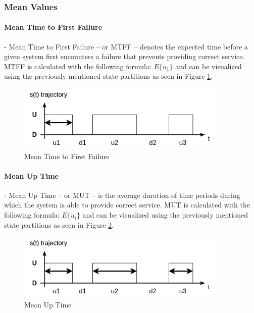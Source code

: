 \subsubsection{Mean Values} \label{background-dep-metrics-mean-values}

\paragraph{Mean Time to First Failure} - Mean Time to First Failure -- or MTFF -- denotes the expected time before a given system first encounters a failure that prevents providing correct service. MTFF is calculated with the following formula: \(E\{u_1\}\) and can be visualized using the previously mentioned state partitions as seen in Figure \ref{fig:mtff}.

\begin{figure}[h]
	\centering
	\includegraphics[width=100mm, keepaspectratio]{figures/MTFF.png}
	\caption{ Mean Time to First Failure \cite{DependabilityBMEMIT} }
	\label{fig:mtff}
\end{figure}

\paragraph{Mean Up Time} - Mean Up Time -- or MUT -- is the average duration of time periods during which the system is able to provide correct service. MUT is calculated with the following formula: \(E\{u_i\}\) and can be visualized using the previously mentioned state partitions as seen in Figure \ref{fig:mut}.

\begin{figure}[h]
	\centering
	\includegraphics[width=100mm, keepaspectratio]{figures/MUT.png}
	\caption{ Mean Up Time \cite{DependabilityBMEMIT} }
	\label{fig:mut}
\end{figure}

